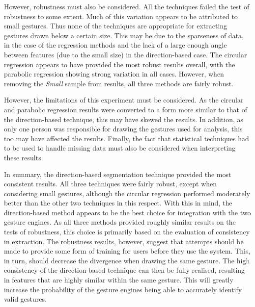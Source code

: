 However, robustness must also be considered. All the techniques failed the test of robustness to some extent. Much of this variation appears to be attributed to small gestures. Thus none of the techniques are appropriate for extracting gestures drawn below a certain size. This may be due to the sparseness of data, in the case of the regression methods and the lack of a large enough angle between features (due to the small size) in the direction-based case. The circular regression appears to have provided the most robust results overall, with the parabolic regression showing strong variation in all cases. However, when removing the \emph{Small} sample from results, all three methods are fairly robust.

However, the limitations of this experiment must be considered. As the circular and parabolic regression results were converted to a form more similar to that of the direction-based technique, this may have skewed the results. In addition, as only one person was responsible for drawing the gestures used for analysis, this too may have affected the results. Finally, the fact that statistical techniques had to be used to handle missing data must also be considered when interpreting these results.

In summary, the direction-based segmentation technique provided the most consistent results. All three techniques were fairly robust, except when considering small gestures, although the circular regression performed moderately better than the other two techniques in this respect. With this in mind, the direction-based method appears to be the best choice for integration with the two gesture engines. As all three methods provided roughly similar results on the tests of robustness, this choice is primarily based on the evaluation of consistency in extraction. The robustness results, however, suggest that attempts should be made to provide some form of training for users before they use the system. This, in turn, should decrease the divergence when drawing the same gesture. The high consistency of the direction-based technique can then be fully realised, resulting in features that are highly similar within the same gesture. This will greatly increase the probability of the gesture engines being able to accurately identify valid gestures.
